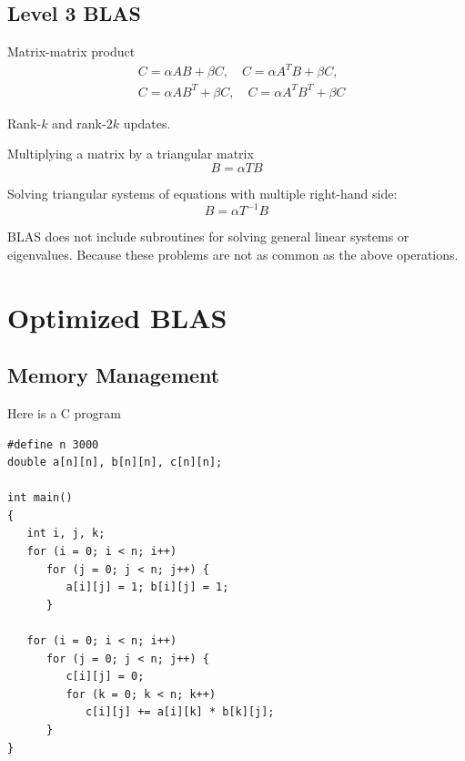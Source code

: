 \subsection{Level 3 BLAS}

\begin{eg}
    Matrix-matrix product
    \begin{equation*}
    \begin{split}
    & C = \alpha AB + \beta C,\quad C = \alpha A^TB + \beta C,\\
    & C = \alpha AB^T + \beta C,\quad C = \alpha A^TB^T + \beta C
    \end{split}
    \end{equation*}
\end{eg}

\begin{eg}
    Rank-$k$ and rank-$2k$ updates.
\end{eg}

\begin{eg}
    Multiplying a matrix by a triangular matrix
    \[
        B = \alpha T B
    \]
\end{eg}

\begin{eg}
    Solving triangular systems of equations with multiple right-hand side: 
    \[
        B = \alpha T^{-1}B
    \]
\end{eg}

BLAS does not include subroutines for solving general linear systems or eigenvalues. Because these problems are not as common as the above operations.

\newpage

\section{Optimized BLAS}

\subsection{Memory Management}

Here is a C program 
\begin{verbatim}
#define n 3000
double a[n][n], b[n][n], c[n][n];

int main()
{
   int i, j, k;
   for (i = 0; i < n; i++)
      for (j = 0; j < n; j++) {
         a[i][j] = 1; b[i][j] = 1;
      }
         
   for (i = 0; i < n; i++)
      for (j = 0; j < n; j++) {
         c[i][j] = 0;
         for (k = 0; k < n; k++)
            c[i][j] += a[i][k] * b[k][j];
      }
}
\end{verbatim}

